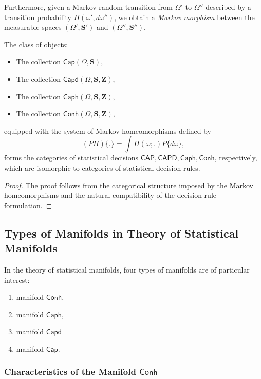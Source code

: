 Furthermore, given a Markov random transition from $\Omega'$ to $\Omega''$ described by a transition probability $\Pi(\omega', d\omega'')$, we obtain a \emph{Markov morphism} between the measurable spaces $(\Omega', \mathbf{S'})$ and $(\Omega'', \mathbf{S''})$.

\begin{theorem}
    The class of objects:
    \begin{itemize}
        \item The collection $\mathsf{Cap}(\Omega, \mathbf{S})$,
        \item The collection $\mathsf{Capd}(\Omega, \mathbf{S}, \mathbf{Z})$,
        \item The collection $\mathsf{\mathsf{Caph}}(\Omega, \mathbf{S}, \mathbf{Z})$,
        \item The collection $\mathsf{\mathsf{Conh}}(\Omega, \mathbf{S}, \mathbf{Z})$,
    \end{itemize}
    equipped with the system of Markov homeomorphisms defined by
    \[
    (P\Pi) \{.\} = \int \Pi(\omega;.) P\{d\omega\},
    \]
    forms the categories of statistical decisions $\mathsf{CAP}, \mathsf{CAPD}, \mathsf{\mathsf{Caph}}, \mathsf{\mathsf{Conh}}$, respectively, which are isomorphic to categories of statistical decision rules.
\end{theorem}

\begin{proof}
    The proof follows from the categorical structure imposed by the Markov homeomorphisms and the natural compatibility of the decision rule formulation.
\end{proof}

\subsection{Types of Manifolds in Theory of Statistical Manifolds}

In the theory of statistical manifolds, four types of manifolds are of particular interest:
\begin{enumerate}
    \item manifold $\mathsf{\mathsf{Conh}}$,
    \item manifold $\mathsf{\mathsf{Caph}}$,
    \item manifold $\mathsf{Capd}$
    \item manifold $\mathsf{Cap}$.
\end{enumerate}

     \subsubsection{Characteristics of the Manifold $\mathsf{\mathsf{Conh}}$} 
      
